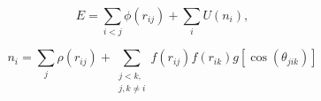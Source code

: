 \documentclass[12pt]{article}
\begin{document}
$$
   E=\sum_{i<j}\phi(r_{ij})+\sum_{i}U(n_{i}),
$$

$$
   n_{i}=\sum_{j}\rho(r_{ij})+\sum_{\substack{j<k,\\j,k\neq i}}f(r_{ij})f(r_{ik})g[\cos(\theta_{jik})]
$$
\end{document}
